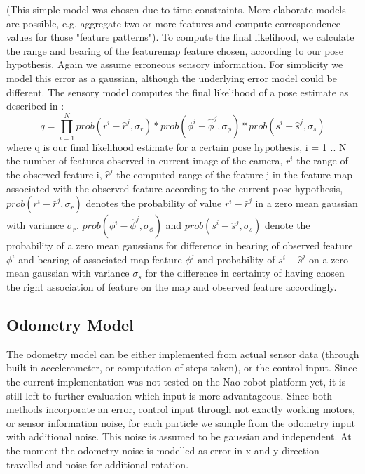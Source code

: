 \documentclass[	DIV=calc,%
							paper=a4,%
							fontsize=9pt,%
							twocolumn]{scrartcl}	 					%
\begin{document}
(This simple model was chosen due to time constraints. More elaborate models are possible, e.g. aggregate two or more features and compute correspondence values for those "feature patterns"). To compute the final likelihood, we calculate the range and bearing of the featuremap feature chosen, according to our pose hypothesis. Again we assume erroneous sensory information. For simplicity we model this error as a gaussian, although the underlying error model could be different. 
The sensory model computes the final likelihood of a pose estimate as described in \cite{ProbabilisticRobotsics}:
\[ q = \prod\limits_{i=1}^{N}{ prob(r^i  - \hat{r}^j,\sigma_r) * prob(\phi^i - \hat{\phi}^j ,\sigma_{\phi}) * prob(s^i - \hat{s}^j ,\sigma_s)  }  \]
where q is our final likelihood estimate for a certain pose hypothesis, i = 1 .. N the number of features observed in current image of the camera, $ r^i $ the range of the observed feature i, $\hat{r}^j$ the computed range of the feature j in the feature map associated with the observed feature according to the current pose hypothesis, $prob(r^i - \hat{r}^j,\sigma_r)$ denotes the probability of value $r^i - \hat{r}^j$ in a zero mean gaussian with variance $\sigma_r$. $prob(\phi^i - \hat{\phi}^j ,\sigma_{\phi})$ and  $prob(s^i - \hat{s}^j ,\sigma_s)$ denote the probability of a zero mean gaussians for difference in bearing of observed feature $\phi^i$ and bearing of associated map feature $\phi^j$ and probability of $s^i - \hat{s}^j$ on a zero mean gaussian with variance $\sigma_s$ for the difference in certainty of having chosen the right association of feature on the map and observed feature accordingly.


\subsection{Odometry Model}
\label{sec:Odometry}
The odometry model can be either implemented from actual sensor data (through built in accelerometer, or computation of steps taken), or the control input. Since the current implementation was not tested on the Nao robot platform yet, it is still left to further evaluation which input is more advantageous. 
Since both methods incorporate an error, control input through not exactly working motors, or sensor information noise, for each particle we sample from the odometry input with additional noise.
This noise is assumed to be gaussian and independent. At the moment the odometry noise is modelled as error in x and y direction travelled and noise for additional rotation.
\end{document}
